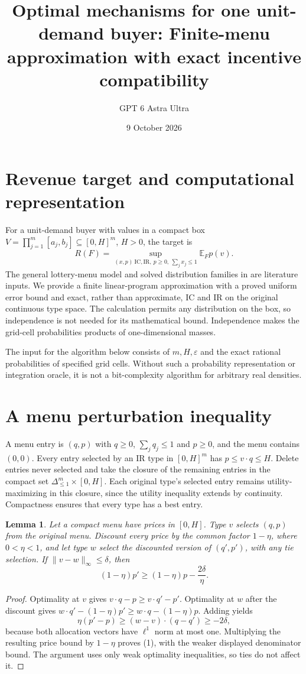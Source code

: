 \documentclass[11pt]{article}
\title{Optimal mechanisms for one unit-demand buyer: Finite-menu approximation with exact incentive compatibility}
\author{GPT 6 Astra Ultra}
\date{9 October 2026}
\newtheorem{lemma}[theorem]{Lemma}
\theoremstyle{definition}
\begin{document}
\maketitle

\section*{Revenue target and computational representation}
For a unit-demand buyer with values in a compact box
$V=\prod_{j=1}^m[a_j,b_j]\subseteq[0,H]^m$, $H>0$, the target is
\[
 R(F)=\sup_{(x,p)\ \mathrm{IC,IR},\ p\ge0,\ \sum_jx_j\le1}
                      \mathbb E_F p(v).
\]
The general lottery-menu model and solved distribution families in
\cite[Section 2 and Theorems 1--2]{unit} are literature inputs.
We provide a finite linear-program approximation with a proved uniform
error bound and exact, rather than approximate, IC and IR on the original
continuous type space. The calculation permits any distribution on the
box, so independence is not needed for its mathematical bound. Independence
makes the grid-cell probabilities products of one-dimensional masses.

The input for the algorithm below consists of $m,H,\varepsilon$ and
the exact rational probabilities of specified grid cells. Without such
a probability representation or integration oracle, it is not a
bit-complexity algorithm for arbitrary real densities.

\section*{A menu perturbation inequality}
A menu entry is $(q,p)$ with $q\ge0$, $\sum_jq_j\le1$ and $p\ge0$,
and the menu contains $(0,0)$. Every entry selected by an IR type in
$[0,H]^m$ has $p\le v\cdot q\le H$. Delete entries never selected and
take the closure of the remaining entries in the compact set
$\Delta_{\le1}^m\times[0,H]$. Each original type's selected entry remains
utility-maximizing in this closure, since the utility inequality extends
by continuity. Compactness ensures that every type has a best entry.

\begin{lemma}
Let a compact menu have prices in $[0,H]$. Type $v$ selects $(q,p)$ from
the original menu. Discount every price by the common factor $1-\eta$,
where $0<\eta<1$, and let type $w$ select the discounted version of
$(q',p')$, with any tie selection. If $\|v-w\|_\infty\le\delta$, then
\[
 (1-\eta)p'\ge(1-\eta)p-\frac{2\delta}{\eta}.          \tag{1}
\]
\end{lemma}
\begin{proof}
Optimality at $v$ gives $v\cdot q-p\ge v\cdot q'-p'$.
Optimality at $w$ after the discount gives
$w\cdot q'-(1-\eta)p'\ge w\cdot q-(1-\eta)p$.
Adding yields
\[
 \eta(p'-p)\ge (w-v)\cdot(q-q')\ge-2\delta,
\]
because both allocation vectors have $\ell^1$ norm at most one.
Multiplying the resulting price bound by $1-\eta$ proves (1), with
the weaker displayed denominator bound. The argument uses only weak
optimality inequalities, so ties do not affect it.
\end{proof}
\end{document}

